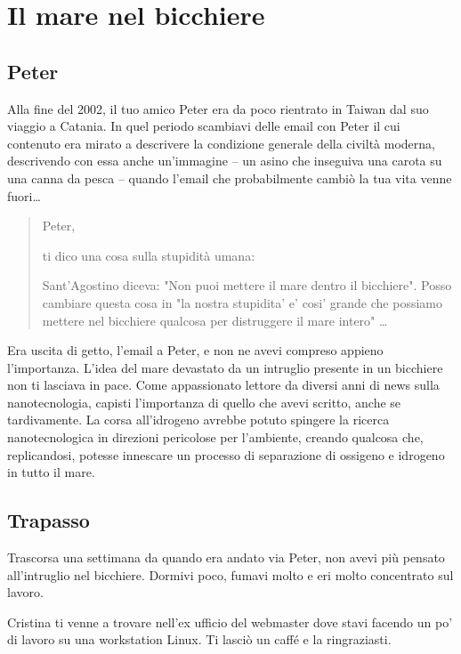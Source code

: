 \chapter{Il mare nel bicchiere}
\label{il_mare_nel_bicchiere} %

\section{Peter}
\label{defs}

Alla fine del 2002, il tuo amico Peter era da poco rientrato in Taiwan dal suo viaggio a Catania. In quel periodo scambiavi delle email con Peter il cui contenuto era mirato a descrivere la condizione generale della civiltà moderna, descrivendo con essa anche un'immagine -- un asino che inseguiva una carota su una canna da pesca -- quando l'email che probabilmente cambiò la tua vita venne fuori\ldots

\begin{quote}
{\ttfamily\small
Peter,

ti dico una cosa sulla stupidità umana:

Sant'Agostino diceva: "Non puoi mettere il mare dentro il bicchiere". Posso cambiare questa cosa in "la nostra stupidita' e' cosi' grande che possiamo mettere nel bicchiere qualcosa per distruggere il mare intero" \ldots
}
\end{quote}

Era uscita di getto, l'email a Peter, e non ne avevi compreso appieno l'importanza. L'idea del mare devastato da un intruglio presente in un bicchiere non ti lasciava in pace. Come appassionato lettore da diversi anni di news sulla nanotecnologia, capisti l'importanza di quello che avevi scritto, anche se tardivamente. La corsa all'idrogeno avrebbe potuto spingere la ricerca nanotecnologica in direzioni pericolose per l'ambiente, creando qualcosa che, replicandosi, potesse innescare un processo di separazione di ossigeno e idrogeno in tutto il mare.

\section{Trapasso}
\label{trapasso}

Trascorsa una settimana da quando era andato via Peter, non avevi più pensato all'intruglio nel bicchiere. Dormivi poco, fumavi molto e eri molto concentrato sul lavoro.

Cristina ti venne a trovare nell'ex ufficio del webmaster dove stavi facendo un po' di lavoro su una workstation Linux. Ti lasciò un caffé e la ringraziasti.


